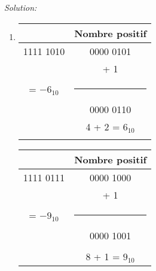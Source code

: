 \documentclass{article}
\newenvironment{solution}
    {\textit{Solution:}}
    {}
\begin{document}
\begin{solution}
\begin{enumerate}
        
        \item
        
        
        \begin{tabular}{|c|c|}
        \hline
        & Nombre positif\\
        \hline    
        1111 1010           &       0000 0101                   \\
        \hspace{101pt}      &       + \hspace{25pt} 1           \\
        = $-6_{10}$         &       \rule{1in}{1pt}             \\
        \hspace{5pt}        &       0000 0110                   \\
        \hspace{5pt}        &       4 + 2 = $6_{10}$            \\
                            &       \hspace{100pt}              \\
        \hline
        \end{tabular}
        
        \hspace{40pt}
        
        \begin{tabular}{|c|c|}
        \hline
        & Nombre positif\\
        \hline    
        1111 0111                   &       0000 1000           \\
                                    &       + \hspace{25pt} 1   \\
        = $-9_{10}$                 &       \rule{1in}{1pt}     \\
        \hspace{5pt}                &       0000 1001           \\
        \hspace{100pt}              &       \hspace{100pt}      \\
                                    &       8 + 1 = $9_{10}$    \\
        \hline
        \end{tabular}
        
        \hspace{40pt}
        

\end{enumerate}
\end{solution}
\end{document}
